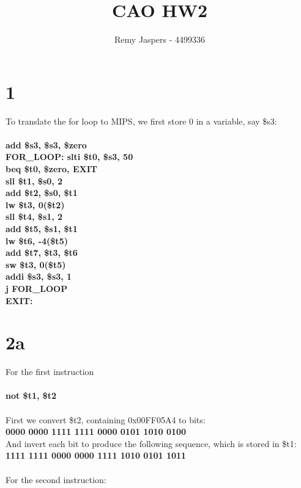\documentclass[10pt,a4paper]{article}
\author{Remy Jaspers - 4499336}
\title{CAO HW2}
\begin{document}
	\maketitle
	\section*{1}
	To translate the for loop to MIPS, we first store 0 in a variable, say \$s3:\\\\
	\textbf{add \$s3, \$s3, \$zero}  \\
	\textbf{FOR\_LOOP: slti \$t0, \$s3, 50} \\	
	\textbf{beq \$t0, \$zero, EXIT}\\
	\textbf{sll \$t1, \$s0, 2}\\
	\textbf{add \$t2, \$s0, \$t1}\\
	\textbf{lw \$t3, 0(\$t2)}\\
	\textbf{sll \$t4, \$s1, 2}\\
	\textbf{add \$t5, \$s1, \$t1}\\
	\textbf{lw \$t6, -4(\$t5)}\\
	\textbf{add \$t7, \$t3, \$t6}\\
	\textbf{sw \$t3, 0(\$t5)}\\
	\textbf{addi \$s3, \$s3, 1} \\
	\textbf{j FOR\_LOOP} \\
	\textbf{EXIT:}
	\section*{2a}
	For the first instruction \\\\ \textbf{not \$t1, \$t2} \\\\ First we convert \$t2, containing 0x00FF05A4 to bits: \\
	
\noindent	\textbf{0000 0000 1111 1111 0000 0101 1010 0100} \\
	
\noindent And invert each bit to produce the following sequence,
which is stored in \$t1: \\
	
\noindent	\textbf{1111 1111 0000 0000 1111 1010 0101 1011} \\\\

\noindent For the second instruction: \\
\end{document}
